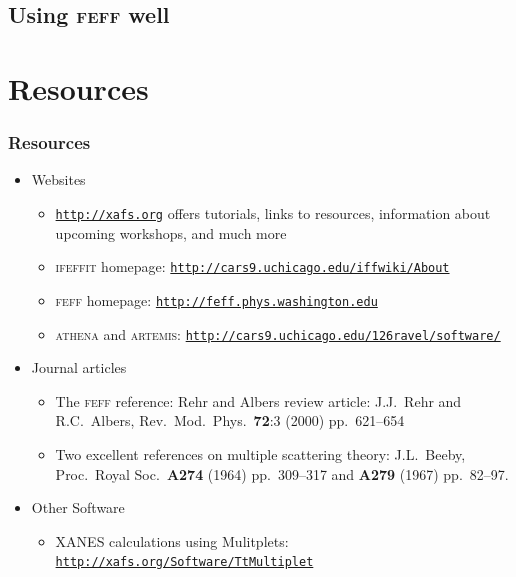 \documentclass[10pt, xcolor=x11names, compress]{beamer}
\begin{document}
\subsection[Good practice]{Using \textsc{feff} well}




\section[Resources]{Resources}

\begin{frame}
  \frametitle{Resources}
  \begin{itemize}
  \item Websites
    \begin{itemize}
    \item \footnotesize
      \href{http://xafs.org}{\color{Purple4}\texttt{http://xafs.org}}
      offers tutorials, links to resources, information about upcoming
      workshops, and much more
    \item \textsc{ifeffit} homepage:
      \href{http://cars9.uchicago.edu/iffwiki/About}
      {\color{Purple4}\texttt{http://cars9.uchicago.edu/iffwiki/About}}
    \item \textsc{feff} homepage:
      \href{http://feff.phys.washington.edu}
      {\color{Purple4}\texttt{http://feff.phys.washington.edu}}
    \item \textsc{athena} and \textsc{artemis}:
      \href{http://cars9.uchicago.edu/~ravel/software/}
      {\color{Purple4}\texttt{http://cars9.uchicago.edu/\char126ravel/software/}}
    \end{itemize}
  \item Journal articles
    \begin{itemize}
    \item \footnotesize The \textsc{feff} reference: Rehr and Albers review article:   J.J.~Rehr and R.C.~Albers,
      Rev.\ Mod.\ Phys.\ \textbf{72}:3 (2000) pp.\ 621--654
    \item Two excellent references on multiple scattering theory:
      J.L.~Beeby, Proc.\ Royal Soc.\ \textbf{A274} (1964) pp.\
      309--317 and \textbf{A279} (1967) pp.\ 82--97.
    \end{itemize}
  \item Other Software
    \begin{itemize}
    \item \footnotesize XANES calculations using Mulitplets:
      \href{http://xafs.org/Software/TtMultiplet}
      {\color{Purple4}\texttt{http://xafs.org/Software/TtMultiplet}}

\end{itemize}
\end{itemize}
\end{frame}
\end{document}
